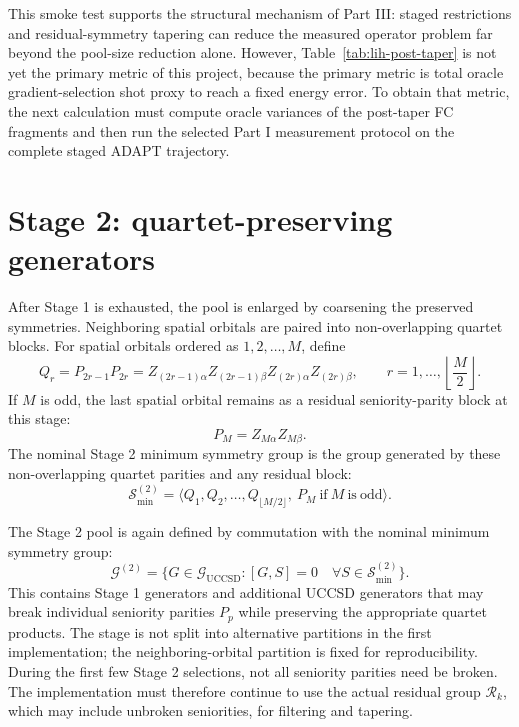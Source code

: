 \documentclass[11pt]{article}
\newcommand{\uccsd}{\mathcal G_{\mathrm{UCCSD}}}
\begin{document}
This smoke test supports the structural mechanism of Part III: staged restrictions and residual-symmetry tapering can reduce the measured operator problem far beyond the pool-size reduction alone. However, Table~\ref{tab:lih-post-taper} is not yet the primary metric of this project, because the primary metric is total oracle gradient-selection shot proxy to reach a fixed energy error. To obtain that metric, the next calculation must compute oracle variances of the post-taper FC fragments and then run the selected Part I measurement protocol on the complete staged ADAPT trajectory.

\section{Stage 2: quartet-preserving generators}

After Stage 1 is exhausted, the pool is enlarged by coarsening the preserved symmetries. Neighboring spatial orbitals are paired into non-overlapping quartet blocks. For spatial orbitals ordered as $1,2,\ldots,M$, define
\begin{equation}
    Q_{r}=P_{2r-1}P_{2r}
    = Z_{(2r-1)\alpha}Z_{(2r-1)\beta}
      Z_{(2r)\alpha}Z_{(2r)\beta},
    \qquad r=1,\ldots,\left\lfloor \frac{M}{2}\right\rfloor.
\end{equation}
If $M$ is odd, the last spatial orbital remains as a residual seniority-parity block at this stage:
\begin{equation}
    P_M=Z_{M\alpha}Z_{M\beta}.
\end{equation}
The nominal Stage 2 minimum symmetry group is the group generated by these non-overlapping quartet parities and any residual block:
\begin{equation}
    \mathcal S_{\min}^{(2)}=\langle Q_1,Q_2,\ldots,Q_{\lfloor M/2\rfloor},\ P_M\ \mathrm{if}\ M\ \mathrm{is\ odd}\rangle.
\end{equation}

The Stage 2 pool is again defined by commutation with the nominal minimum symmetry group:
\begin{equation}
    \mathcal G^{(2)}
    =\{G\in\uccsd:[G,S]=0\quad \forall S\in\mathcal S_{\min}^{(2)}\}.
\end{equation}
This contains Stage 1 generators and additional UCCSD generators that may break individual seniority parities $P_p$ while preserving the appropriate quartet products. The stage is not split into alternative partitions in the first implementation; the neighboring-orbital partition is fixed for reproducibility. During the first few Stage 2 selections, not all seniority parities need be broken. The implementation must therefore continue to use the actual residual group $\mathcal R_k$, which may include unbroken seniorities, for filtering and tapering.
\end{document}
